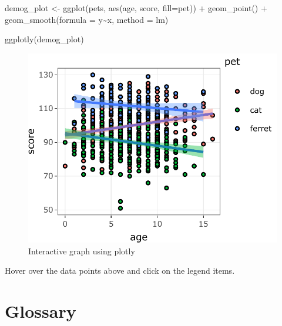 \documentclass[
  oneside]{book}
\newenvironment{Shaded}{\begin{snugshade}}{\end{snugshade}}
\newcommand{\AttributeTok}[1]{\textcolor[rgb]{0.77,0.63,0.00}{#1}}
\newcommand{\FunctionTok}[1]{\textcolor[rgb]{0.00,0.00,0.00}{#1}}
\newcommand{\NormalTok}[1]{#1}
\newcommand{\OtherTok}[1]{\textcolor[rgb]{0.56,0.35,0.01}{#1}}
\newcommand{\SpecialCharTok}[1]{\textcolor[rgb]{0.00,0.00,0.00}{#1}}
\begin{document}
\begin{Shaded}
\begin{Highlighting}[]
\NormalTok{demog\_plot }\OtherTok{\textless{}{-}} \FunctionTok{ggplot}\NormalTok{(pets, }\FunctionTok{aes}\NormalTok{(age, score, }\AttributeTok{fill=}\NormalTok{pet)) }\SpecialCharTok{+}
  \FunctionTok{geom\_point}\NormalTok{() }\SpecialCharTok{+}
  \FunctionTok{geom\_smooth}\NormalTok{(}\AttributeTok{formula =}\NormalTok{ y}\SpecialCharTok{\textasciitilde{}}\NormalTok{x, }\AttributeTok{method =}\NormalTok{ lm)}

\FunctionTok{ggplotly}\NormalTok{(demog\_plot)}
\end{Highlighting}
\end{Shaded}

\begin{figure}

{\centering \includegraphics[width=0.9\linewidth]{images/plotly-1} 

}

\caption{Interactive graph using plotly}\label{fig:plotly}
\end{figure}

\begin{info}
Hover over the data points above and click on the legend items.

\end{info}

\hypertarget{glossary-ggplot}{%
\section{Glossary}\label{glossary-ggplot}}
\end{document}

